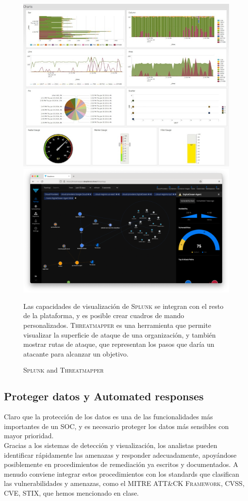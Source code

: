 \begin{figure}[htbp]
   \centering
   \includegraphics[width=0.49\columnwidth]{images/06/splunk.jpg}
   \includegraphics[width=0.49\columnwidth]{images/06/threatmapper.png}
   \caption{\textsc{Splunk} and \textsc{Threatmapper}}
   \label{fig:06/splunk}
   Las capacidades de visualización de \textsc{Splunk} se integran con el resto de la plataforma, y es posible crear cuadros de mando personalizados. \textsc{Threatmapper} es una herramienta que permite visualizar la superficie de ataque de una organización, y también mostrar rutas de ataque, que representan los pasos que daría un atacante para alcanzar un objetivo.
\end{figure}

\subsection{Proteger datos y Automated responses}

Claro que la protección de los datos es una de las funcionalidades más importantes de un SOC, y es necesario proteger los datos más sensibles con mayor prioridad.\\
Gracias a los sistemas de detección y visualización, los analistas pueden identificar rápidamente las amenazas y responder adecuadamente, apoyándose posiblemente en procedimientos de remediación ya escritos y documentados. 
A menudo conviene integrar estos procedimientos con los standards que clasifican las vulnerabilidades y amenazas, como el \textsc{MITRE ATT\&CK Framework}, \textsc{CVSS}, \textsc{CVE}, \textsc{STIX}, que hemos mencionado en clase. 

